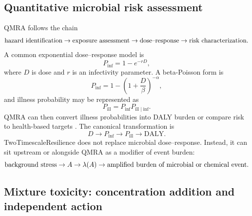 	\subsection{Quantitative microbial risk assessment}
	
	QMRA follows the chain
	\begin{equation}
		\hbox{hazard identification}\rightarrow\hbox{exposure assessment}\rightarrow\hbox{dose--response}\rightarrow\hbox{risk characterization}.
	\end{equation}
	A common exponential dose--response model is
	\begin{equation}
		P_{\mathrm{inf}}=1-e^{-rD},
	\end{equation}
	where $D$ is dose and $r$ is an infectivity parameter. A beta-Poisson form is
	\begin{equation}
		P_{\mathrm{inf}}=1-\left(1+\frac{D}{\beta}\right)^{-\alpha},
	\end{equation}
	and illness probability may be represented as
	\begin{equation}
		P_{\mathrm{ill}}=P_{\mathrm{inf}}P_{\mathrm{ill}\mid\mathrm{inf}}.
	\end{equation}
	QMRA can then convert illness probabilities into DALY burden or compare risk to health-based targets \citep{who2016qmra,healthcanada2019qmra}. The canonical transformation is
	\begin{equation}
		D\rightarrow P_{\mathrm{inf}}\rightarrow P_{\mathrm{ill}}\rightarrow \mathrm{DALY}.
	\end{equation}
	TwoTimescaleResilience does not replace microbial dose--response. Instead, it can sit upstream or alongside QMRA as a modifier of event burden:
	\begin{equation}
		\hbox{background stress}\rightarrow A\rightarrow\lambda(A)\rightarrow \hbox{amplified burden of microbial or chemical event}.
	\end{equation}
	
	\subsection{Mixture toxicity: concentration addition and independent action}
	
